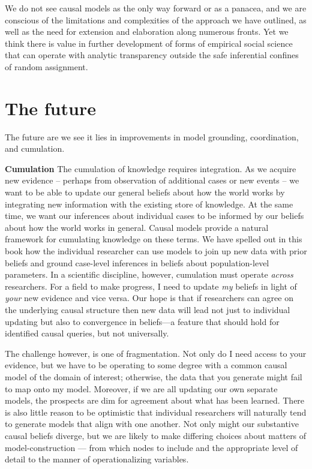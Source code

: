 \documentclass[
  12pt,
]{book}
\begin{document}
We do not see causal models as the only way forward or as a panacea, and we are conscious of the limitations and complexities of the approach we have outlined, as well as the need for extension and elaboration along numerous fronts. Yet we think there is value in further development of forms of empirical social science that can operate with analytic transparency outside the safe inferential confines of random assignment.

\hypertarget{the-future}{%
\section{The future}\label{the-future}}

The future are we see it lies in improvements in model grounding, coordination, and cumulation.

\textbf{Cumulation} The cumulation of knowledge requires integration. As we acquire new evidence -- perhaps from observation of additional cases or new events -- we want to be able to update our general beliefs about how the world works by integrating new information with the existing store of knowledge. At the same time, we want our inferences about individual cases to be informed by our beliefs about how the world works in general.
Causal models provide a natural framework for cumulating knowledge on these terms. We have spelled out in this book how the individual researcher can use models to join up new data with prior beliefs and ground case-level inferences in beliefs about population-level parameters. In a scientific discipline, however, cumulation must operate \emph{across} researchers. For a field to make progress, I need to update \emph{my} beliefs in light of \emph{your} new evidence and vice versa. Our hope is that if researchers can agree on the underlying causal structure then new data will lead not just to individual updating but also to convergence in beliefs---a feature that should hold for identified causal queries, but not universally.

The challenge however, is one of fragmentation. Not only do I need access to your evidence, but we have to be operating to some degree with a common causal model of the domain of interest; otherwise, the data that you generate might fail to map onto my model. Moreover, if we are all updating our own separate models, the prospects are dim for agreement about what has been learned. There is also little reason to be optimistic that individual researchers will naturally tend to generate models that align with one another. Not only might our substantive causal beliefs diverge, but we are likely to make differing choices about matters of model-construction --- from which nodes to include and the appropriate level of detail to the manner of operationalizing variables.
\end{document}
